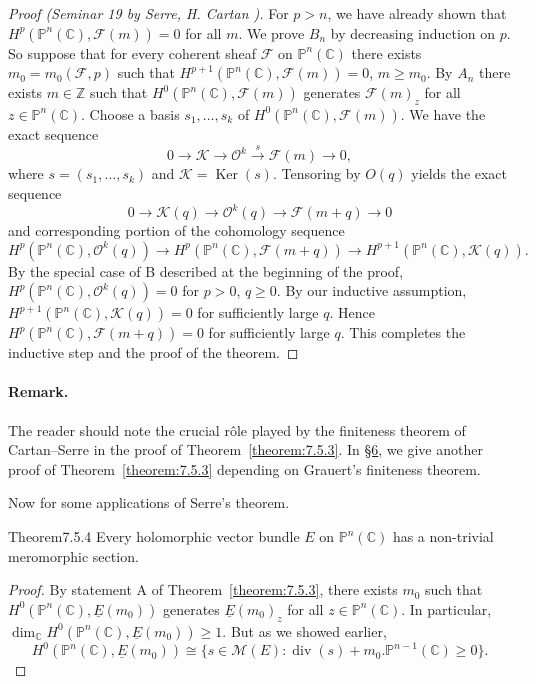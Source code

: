 \begin{proof}[Proof (Seminar 19 by Serre, H. Cartan \cite{bib:II:cartan-h:2})]
For $p>n$, we have already shown that $H^p(\mathbb{P}^n(\mathbb{C}),\mathcal{F}(m))=0$ for all $m$. We prove $B_n$ by decreasing induction on $p$. So suppose that for every coherent sheaf $\mathcal{F}$ on $\mathbb{P}^n(\mathbb{C})$ there exists $m_0=m_0(\mathcal{F},p)$ such that $H^{p+1}(\mathbb{P}^n(\mathbb{C}),\mathcal{F}(m))=0$, $m\geq m_0$. By $A_n$ there exists $m\in\mathbb{Z}$ such that $H^0(\mathbb{P}^n(\mathbb{C}),\mathcal{F}(m))$ generates $\mathcal{F}(m)_z$ for all $z\in\mathbb{P}^n(\mathbb{C})$. Choose a basis $s_1,\ldots,s_k$ of $H^0(\mathbb{P}^n(\mathbb{C}),\mathcal{F}(m))$. We have the exact sequence
\[
0\to\mathcal{K}\to\mathcal{O}^k\xrightarrow{s}\mathcal{F}(m)\to0,
\]
where $s=(s_1,\ldots,s_k)$ and $\mathcal{K}=\operatorname{Ker}(s)$. Tensoring by $O(q)$ yields the exact sequence
\[
0\to\mathcal{K}(q)\to\mathcal{O}^k(q)\to\mathcal{F}(m+q)\to0
\]
and corresponding portion of the cohomology sequence
\[
H^p(\mathbb{P}^n(\mathbb{C}),\mathcal{O}^k(q))\to H^p(\mathbb{P}^n(\mathbb{C}),\mathcal{F}(m+q))\to H^{p+1}(\mathbb{P}^n(\mathbb{C}),\mathcal{K}(q)).
\]
By the special case of B described at the beginning of the proof, $H^p(\mathbb{P}^n(\mathbb{C}),\mathcal{O}^k(q))=0$ for $p>0$, $q\geq0$. By our inductive assumption, $H^{p+1}(\mathbb{P}^n(\mathbb{C}),\mathcal{K}(q))=0$ for sufficiently large $q$. Hence $H^p(\mathbb{P}^n(\mathbb{C}),\mathcal{F}(m+q))=0$ for sufficiently large $q$. This completes the inductive step and the proof of the theorem.
\end{proof}
\paragraph{Remark.} The reader should note the crucial r\^ole played by the finiteness theorem of Cartan--Serre in the proof of Theorem~\ref{theorem:7.5.3}. In \hyperref[sec:7:6]{\S6}, we give another proof of Theorem~\ref{theorem:7.5.3} depending on Grauert's finiteness theorem.

Now for some applications of Serre's theorem.

\begin{originaltheorem}{Theorem}{7.5.4}
Every holomorphic vector bundle $E$ on $\mathbb{P}^n(\mathbb{C})$ has a non-trivial meromorphic section.
\end{originaltheorem}
\begin{proof}
By statement A of Theorem~\ref{theorem:7.5.3}, there exists $m_0$ such that $H^0(\mathbb{P}^n(\mathbb{C}),\underline{E}(m_0))$ generates $\underline{E}(m_0)_z$ for all $z\in\mathbb{P}^n(\mathbb{C})$. In particular, $\dim_{\mathbb{C}}H^0(\mathbb{P}^n(\mathbb{C}),\underline{E}(m_0))\geq1$. But as we showed earlier,
\[
H^0(\mathbb{P}^n(\mathbb{C}),\underline{E}(m_0))\cong\{s\in \mathcal{M}(E):\operatorname{div}(s)+m_0.\mathbb{P}^{n-1}(\mathbb{C})\geq0\}.
\]
\end{proof}
